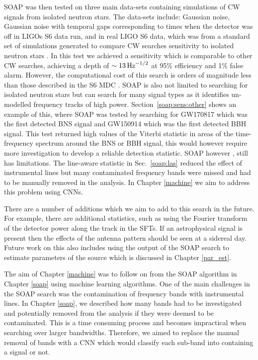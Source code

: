 SOAP was then tested on three main data-sets containing simulations of \gls{CW}
signals from isolated neutron stars.  The data-sets include: Gaussian noise,
Gaussian noise with temporal gaps corresponding to times
when the detector was off in \glspl{LIGO} S6 data run, and in real \gls{LIGO}
S6 data, which was from a standard set of simulations generated to compare
\gls{CW} searches sensitivity to isolated neutron stars \citep{walsh2016ComparisonMethods}.  In this
test we achieved a sensitivity which is comparable to other \gls{CW} searches,
achieving a depth of $\sim 13 \,
\rm{Hz}^{-1/2}$ at 95\% efficiency and 1\% false alarm.  However, the
computational cost of this search is orders of magnitude less than those
described in the S6 \gls{MDC} \citep{walsh2016ComparisonMethods}.  SOAP is also
not limited to searching for isolated neutron stars but can search for many
signal types as it identifies un-modelled
frequency tracks of high power.  Section~\ref{soap:sens:other} shows an example
of this, where SOAP was tested by searching for GW170817 which was the first
detected \gls{BNS} signal and GW150914 which was the first detected \gls{BBH}
signal.  This test returned high values of the Viterbi statistic in areas of
the time-frequency spectrum around the \gls{BNS} or \gls{BBH} signal, this
would however require more investigation to develop a reliable detection statistic.  SOAP however , still has limitations.
The line-aware statistic in Sec.~\ref{soap:las} reduced the effect of
instrumental lines but many contaminated frequency bands were missed and had to
be manually removed in the analysis. In Chapter \ref{machine} we aim to address this problem using \glspl{CNN}.

There are a number of additions which we aim to add to this search in the
future.  For example, there are additional statistics, such as using the
Fourier transform of the detector power along the track in the \glspl{SFT}.  If
an astrophysical signal is present then the effects of the antenna pattern
should be seen at a sidereal day.  Future work on this also includes using the
output of the SOAP search to estimate parameters of the source which is discussed in Chapter \ref{par_est}. 

\bigskip

The aim of Chapter \ref{machine} was to follow on from the SOAP algorithm in
Chapter \ref{soap} using machine learning algorithms.  One of the main
challenges in the SOAP search was the contamination of frequency bands with
instrumental lines.  In Chapter \ref{soap}, we described how many bands had to
be investigated and potentially removed from the analysis if they were deemed to
be contaminated.  This is a time consuming process and becomes impractical when
searching over larger bandwidths.  Therefore, we aimed to replace the manual
removal of bands with a \gls{CNN} which would classify each sub-band into
containing a signal or not.

